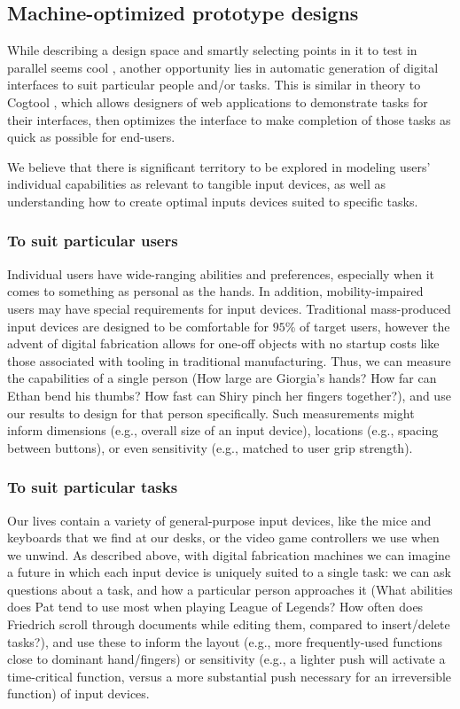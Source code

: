\subsection{Machine-optimized prototype designs}

While describing a design space and smartly selecting points in it to test in parallel seems cool , another opportunity lies in automatic generation of digital interfaces to suit particular people and/or tasks. This is similar in theory to Cogtool \cite{john-cogtool}, which allows designers of web applications to demonstrate tasks for their interfaces, then optimizes the interface to make completion of those tasks as quick as possible for end-users.

We believe that there is significant territory to be explored in modeling users' individual capabilities as relevant to tangible input devices, as well as understanding how to create optimal inputs devices suited to specific tasks.

    \subsubsection{To suit particular users}

    Individual users have wide-ranging abilities and preferences, especially when it comes to something as personal as the hands. In addition, mobility-impaired users may have special requirements for input devices. Traditional mass-produced input devices are designed to be comfortable for $95$\% of target users, however the advent of digital fabrication allows for one-off objects with no startup costs like those associated with tooling in traditional manufacturing. Thus, we can measure the capabilities of a single person (How large are Giorgia's hands? How far can Ethan bend his thumbs? How fast can Shiry pinch her fingers together?), and use our results to design for that person specifically. Such measurements might inform dimensions (e.g., overall size of an input device), locations (e.g., spacing between buttons), or even sensitivity (e.g., matched to user grip strength).

    \subsubsection{To suit particular tasks}
    
    Our lives contain a variety of general-purpose input devices, like the mice and keyboards that we find at our desks, or the video game controllers we use when we unwind. As described above, with digital fabrication machines we can imagine a future in which each input device is uniquely suited to a single task: we can ask questions about a task, and how a particular person approaches it (What abilities does Pat tend to use most when playing League of Legends? How often does Friedrich scroll through documents while editing them, compared to insert/delete tasks?), and use these to inform the layout (e.g., more frequently-used functions close to dominant hand/fingers) or sensitivity (e.g., a lighter push will activate a time-critical function, versus a more substantial push necessary for an irreversible function) of input devices.

